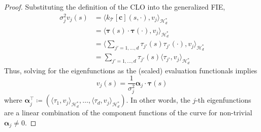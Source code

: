 \documentclass[pdflatex,iicol]{sn-jnl}%
\theoremstyle{thmstyleone}%
\theoremstyle{thmstyletwo}%
\theoremstyle{thmstylethree}%
\begin{document}
\begin{proof}
    Substituting the definition of the CLO into the generalized FIE,
    \begin{align}
        \sigma_j^2v_j(s) &= \langle k_{\mathcal{T}}[\boldsymbol{c}](s,\cdot), v_j\rangle_{\mathcal{H}^*_d}\\ \nonumber
        &= \langle \boldsymbol{\tau}(s)\cdot \boldsymbol{\tau}(\cdot),  v_j\rangle_{\mathcal{H}^*_d} \\ \nonumber
        &=\langle \sum_{j'=1,\dots,d}\tau_{j'}(s)\tau_{j'}(\cdot), v_j\rangle_{\mathcal{H}^*_d}\\ \nonumber           &=\sum_{j'=1,\dots,d}\tau_{j'}(s)\langle \tau_{j'}, v_j \rangle_{\mathcal{H}^*_d} \nonumber           
    \end{align}
    Thus, solving for the eigenfunctions as the (scaled) evaluation functionals implies
    \begin{equation} \label{equ:eigfunc}
        v_j(s) = \frac{1}{\sigma^2_j}\boldsymbol{\alpha}_j \cdot \boldsymbol{\tau}(s)
    \end{equation}
    where $\boldsymbol{\alpha}^{\top}_j \coloneqq (\langle \tau_1,v_j\rangle_{\mathcal{H}^*_d},\dots,\langle \tau_d,v_j\rangle_{\mathcal{H}^*_d})$. In other words, the $j$-th eigenfunctions are a linear combination of the component functions of the curve for non-trivial $\boldsymbol{\alpha}_j \neq 0$. 
    

\end{proof}
\end{document}
